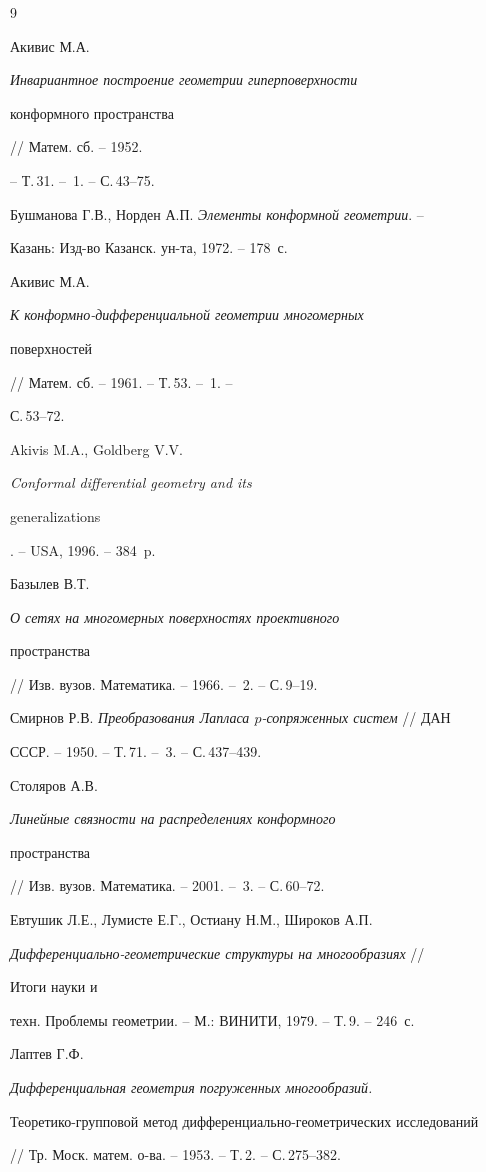 \begin{thebibliography}{9} 


 




Акивис М.А. {\em Инвариантное построение геометрии гиперповерхности 


конформного пространства} // Матем. сб. -- 1952. 


-- Т.\,31. -- \No\,1. -- С.\,43--75. 




Бушманова Г.В., Норден А.П. {\em Элементы конформной геометрии}. -- 


Казань: Изд-во Казанск. ун-та, 1972. -- 178~с. 




Акивис М.А. {\em К конформно-дифференциальной геометрии многомерных 


поверхностей} // Матем. сб. -- 1961. -- Т.\,53. -- \No\,1. -- 


С.\,53--72. 




Akivis M.A., Goldberg V.V. {\em Conformal differential geometry and its 


generalizations}. -- USA, 1996. -- 384~p. 




Базылев В.Т. {\em О сетях на многомерных поверхностях проективного 


пространства} // Изв. вузов. Математика. -- 1966. -- \No\,2. -- С.\,9--19. 




Смирнов Р.В. {\em Преобразования Лапласа $p$-сопряженных систем} // ДАН 


СССР. -- 1950. -- Т.\,71. -- \No\,3. -- С.\,437--439. 




Столяров А.В. {\em Линейные связности на распределениях конформного 


пространства} // Изв. вузов. Математика. -- 2001. -- \No\,3. -- С.\,60--72. 




Евтушик Л.Е., Лумисте Е.Г., Остиану Н.М., Широков А.П. 


{\em Дифференциально-геометрические структуры на многообразиях} // 


Итоги науки и 


техн. Проблемы геометрии. -- М.: ВИНИТИ, 1979. -- Т.\,9. -- 246~с. 




Лаптев Г.Ф. {\em Дифференциальная геометрия погруженных многообразий.


Теоретико-груп\-по\-вой метод дифференциально-геометрических исследований} 


// Тр. Моск. матем. о-ва. -- 1953. -- Т.\,2. -- С.\,275--382. 


\end{thebibliography} 



